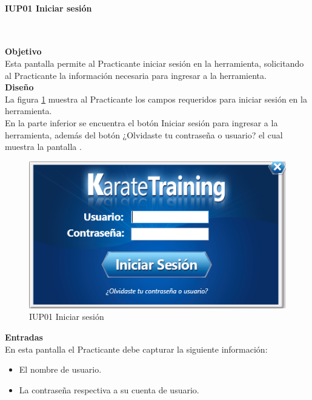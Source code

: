 \paragraph{IUP01 Iniciar sesión}  \hspace{1cm}\\ 
\label{pant:IUP01}

\textbf{\textcolor[rgb]{0, 0, 0.545098}{Objetivo}}\\
Esta pantalla permite al Practicante iniciar sesión en la herramienta, solicitando al Practicante la información necesaria para ingresar a la herramienta.\\

\textbf{\textcolor[rgb]{0, 0, 0.545098}{Diseño}}\\
La figura \ref{fig:IUP01} muestra al Practicante los campos requeridos para iniciar sesión en la herramienta. \\

En la parte inferior se encuentra el botón Iniciar sesión para ingresar a la herramienta, además del botón  ¿Olvidaste tu contraseña o usuario? el cual muestra la pantalla .

\begin{figure}[H]
	\centering
		\includegraphics[scale=1]{./Figuras/Pantallas/IUP01Iniciar_sesion}
	\caption{IUP01 Iniciar sesión}
	\label{fig:IUP01}
\end{figure}

\textbf{\textcolor[rgb]{0, 0, 0.545098}{Entradas}}\\
En esta pantalla el Practicante debe capturar la siguiente información:

\begin{itemize}
	\item El nombre de usuario.
	\item La contraseña respectiva a su cuenta de usuario.
\end{itemize}

